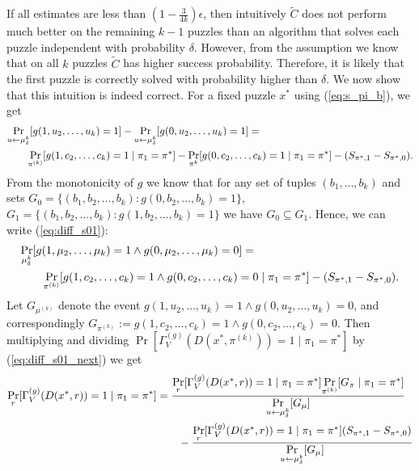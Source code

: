 If all estimates are less than $(1-\frac{3}{4k})\epsilon$, then intuitively $\widetilde{C}$
does not perform much better on the remaining $k-1$ puzzles than an algorithm that solves each puzzle independent with probability $\delta$.
However, from the assumption we know that on all $k$ puzzles $\widetilde{C}$ has higher success probability.
Therefore, it is likely that the first puzzle is correctly solved with probability higher than $\delta$.
%
%
We now show that this intuition is indeed correct. For a fixed puzzle $x^*$ using (\ref{eq:s_pi_b}), we get
\begin{align}
\label{eq:diff_s01}
  &\underset{u \leftarrow \mu_{\delta}^k}{\Pr}[g(1, u_2, \dots, u_k)=1] - \underset{u \leftarrow \mu_{\delta}^k}{\Pr}[g(0, u_2, \dots, u_k)=1] = \notag\\
&\mbox\qquad  \underset{\pi^{(k)}}{\Pr}[g(1, c_2, \dots, c_k) =1 \mid \pi_1 = \pi^*] - \underset{\pi^k}{\Pr}[g(0, c_2, \dots, c_k) = 1 \mid \pi_1 = \pi^*] - (S_{\pi^*,1} - S_{\pi^*,0}).
\end{align}
From the monotonicity of $g$ we know that for any set of tuples $(b_1, \dots, b_k)$
and sets $G_0 = \{ (b_1, b_2, \dots, b_k): g(0, b_2, \dots, b_k) = 1\}$, $ G_1 = \{(b_1, b_2, \dots, b_k) : g(1, b_2, \dots, b_k) = 1 \}$
we have $G_0 \subseteq G_1$. Hence, we can write (\ref{eq:diff_s01}):
\begin{align}
  \label{eq:diff_s01_next}
  &\underset{\mu_{\delta}^k}{\Pr}[g(1, \mu_2, \dots, \mu_k) = 1 \land g(0, \mu_2, \dots, \mu_k) = 0] = \notag\\
&\mbox\qquad  \underset{\pi^{(k)}}{\Pr}[g(1, c_2, \dots, c_k) = 1 \land g(0, c_2, \dots, c_k) = 0 \mid \pi_1 = \pi^*] - (S_{\pi^*,1} - S_{\pi^*,0}).
\end{align}
Let $G_{\mu^{(k)}}$ denote the event $g(1, u_2, \dots, u_k) = 1 \land g(0, u_2, \dots, u_k) = 0$, and correspondingly
$G_{\pi^{(k)}} := g(1, c_2, \dots, c_k) = 1 \land g(0, c_2, \dots, c_k) = 0$.
Then multiplying and dividing $\underset{}{\Pr}[\Gamma_V^{(g)}(D(x^*, \pi^{(k)})) = 1 \mid \pi_1 = \pi^*]$ by (\ref{eq:diff_s01_next}) we get
\begin{align}
\label{eq:pr_d_succ_0}
  \underset{r}{\Pr}[\Gamma_V^{(g)}(D(x^*, r)) = 1 \mid \pi_1 = \pi^*] &=
  \frac{\underset{r}{\Pr}[\Gamma_V^{(g)}(D(x^*, r)) = 1 \mid \pi_1 = \pi^*] \underset{\pi^{(k)}}{\Pr}[G_{\pi} \mid \pi_1 = \pi^*]} {\underset{u \leftarrow \mu_{\delta}^{k}}{\Pr}[G_{\mu}]} \notag\\
  & \mbox\qquad - \frac{\underset{r}{\Pr}[\Gamma_V^{(g)}(D(x^*, r)) = 1 \mid \pi_1 = \pi^*](S_{\pi^*,1} - S_{\pi^*,0})}{\underset{u \leftarrow \mu_{\delta}^{k}}{\Pr}[G_{\mu}]}
\end{align}
